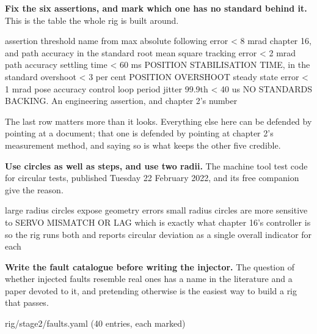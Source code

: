 \begin{steps}
\item \textbf{Fix the six assertions, and mark which one has no standard behind
it.} This is the table the whole rig is built around.
\begin{plaincode}
assertion                          threshold        name from
max absolute following error       < 8 mrad         chapter 16, and path
                                                    accuracy in the standard
root mean square tracking error    < 2 mrad         path accuracy
settling time                      < 60 ms          POSITION STABILISATION
                                                    TIME, in the standard
overshoot                          < 3 per cent     POSITION OVERSHOOT
steady state error                 < 1 mrad         pose accuracy
control loop period jitter         99.9th < 40 us   NO STANDARDS BACKING.
                                                    An engineering assertion,
                                                    and chapter 2's number
\end{plaincode}
The last row matters more than it looks. Everything else here can be defended
by pointing at a document; that one is defended by pointing at chapter 2's
measurement method, and saying so is what keeps the other five credible.

\item \textbf{Use circles as well as steps, and use two radii.} The machine tool
test code for circular tests, published Tuesday 22 February 2022, and its free
companion give the reason.
\begin{plaincode}
large radius circles   expose geometry errors
small radius circles   are more sensitive to SERVO MISMATCH OR LAG
                       which is exactly what chapter 16's controller is
so the rig runs both   and reports circular deviation as a single overall
                       indicator for each
\end{plaincode}

\item \textbf{Write the fault catalogue before writing the injector.} The
question of whether injected faults resemble real ones has a name in the
literature and a paper devoted to it, and pretending otherwise is the easiest
way to build a rig that passes.
\begin{plaincode}
rig/stage2/faults.yaml   (40 entries, each marked)


\end{plaincode}
\end{steps}

